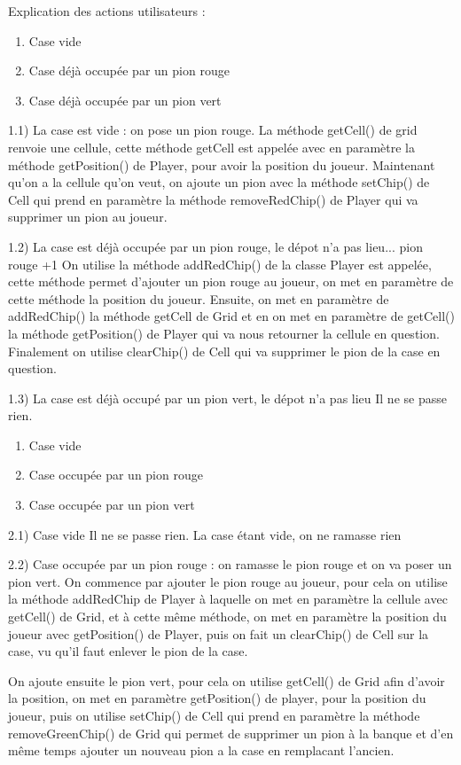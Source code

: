 Explication des actions utilisateurs : 
\begin{enumerate}
	\item Case vide
	\item Case déjà occupée par un pion rouge
	\item Case déjà occupée par un pion vert
\end{enumerate}

1.1) La case est vide : on pose un pion rouge.
La méthode getCell() de grid renvoie une cellule, cette méthode getCell est appelée avec en paramètre la méthode getPosition() de Player, pour avoir la position du joueur.
Maintenant qu'on a la cellule qu'on veut, on ajoute un pion avec la méthode setChip() de Cell qui prend en paramètre la méthode removeRedChip() de Player qui va supprimer un pion au joueur.

1.2) La case est déjà occupée par un pion rouge, le dépot n'a pas lieu... pion rouge +1
On utilise la méthode addRedChip() de la classe Player est appelée, cette méthode permet d'ajouter un pion rouge au joueur, on met en paramètre de cette méthode la position du joueur. Ensuite, on met en paramètre de addRedChip() la méthode getCell de Grid et en on met en paramètre de getCell() la méthode getPosition() de Player qui va nous retourner la cellule en question.
Finalement on utilise clearChip() de Cell qui va supprimer le pion de la case en question.

1.3) La case est déjà occupé par un pion vert, le dépot n'a pas lieu
Il ne se passe rien.

\begin{enumerate}
	\item Case vide
	\item Case occupée par un pion rouge
	\item Case occupée par un pion vert
\end{enumerate}

2.1) Case vide
Il ne se passe rien. La case étant vide, on ne ramasse rien

2.2) Case occupée par un pion rouge : on ramasse le pion rouge et on va poser un pion vert.
On commence par ajouter le pion rouge au joueur, pour cela on utilise la méthode addRedChip de Player à laquelle on met en paramètre la cellule avec getCell() de Grid, et à cette même méthode,
on met en paramètre la position du joueur avec getPosition() de Player, puis on fait un clearChip() de Cell sur la case, vu qu'il faut enlever le pion de la case.

On ajoute ensuite le pion vert, pour cela on utilise getCell() de Grid afin d'avoir la position,
on met en paramètre getPosition() de player, pour la position du joueur, puis on utilise setChip() de Cell qui prend en paramètre la méthode removeGreenChip() de Grid qui permet de supprimer un pion à la banque et d'en même temps ajouter un nouveau pion a la case en remplacant l'ancien.
	 


